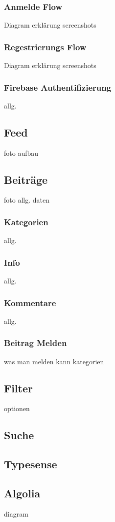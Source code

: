 \subsubsection{Anmelde Flow}
Diagram
erklärung
screenshots
\subsubsection{Regestrierungs Flow}

Diagram
erklärung
screenshots


\subsubsection{Firebase Authentifizierung}
allg.


\subsection{Feed}
foto
aufbau
\subsection{Beiträge}
foto
allg.
daten
\subsubsection{Kategorien}
allg.


\subsubsection{Info}
allg.
\subsubsection{Kommentare}
allg.
\subsubsection{Beitrag Melden}
was  man melden kann
kategorien


\subsection{Filter}
optionen
\subsection{Suche}
\subsection{Typesense}
\subsection{Algolia}
diagram
